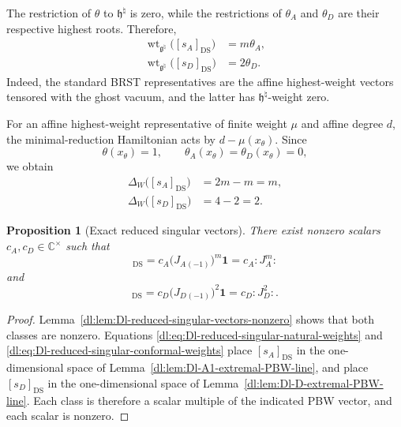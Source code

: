 \documentclass[11pt,reqno]{amsart}
\newtheorem{proposition}[theorem]{Proposition}
\theoremstyle{definition}
\theoremstyle{remark}
\begin{document}
The restriction of \(\theta\) to
\(\mathfrak h^\natural\) is zero, while the restrictions of
\(\theta_A\) and \(\theta_D\) are their respective highest roots.
Therefore,
\begin{equation}
\begin{aligned}
  \operatorname{wt}_{\mathfrak g^\natural}
  \bigl([s_A]_{\mathrm{DS}}\bigr)
  &=m\theta_A,\\
  \operatorname{wt}_{\mathfrak g^\natural}
  \bigl([s_D]_{\mathrm{DS}}\bigr)
  &=2\theta_D.
\end{aligned}
\label{dl:eq:Dl-reduced-singular-natural-weights}
\end{equation}
Indeed, the standard BRST representatives are the affine
highest-weight vectors tensored with the ghost vacuum, and the latter
has \(\mathfrak h^\natural\)-weight zero.

For an affine highest-weight representative of finite weight \(\mu\)
and affine degree \(d\), the minimal-reduction Hamiltonian acts by
\(d-\mu(x_\theta)\).  Since
\begin{equation*}
  \theta(x_\theta)=1,
  \qquad
  \theta_A(x_\theta)=\theta_D(x_\theta)=0,
\end{equation*}
we obtain
\begin{equation}
\begin{aligned}
  \Delta_W\bigl([s_A]_{\mathrm{DS}}\bigr)
  &=
  2m-m=m,\\
  \Delta_W\bigl([s_D]_{\mathrm{DS}}\bigr)
  &=
  4-2=2.
\end{aligned}
\label{dl:eq:Dl-reduced-singular-conformal-weights}
\end{equation}

\begin{proposition}[Exact reduced singular vectors]
\label{dl:prop:Dl-exact-reduced-singular-vectors}
There exist nonzero scalars
\(c_A,c_D\in\mathbb C^\times\) such that
\begin{equation*}
  [s_A]_{\mathrm{DS}}
  =
  c_A
  \bigl(J_A{}_{(-1)}\bigr)^m\mathbf1
  =
  c_A:J_A^m:
\end{equation*}
and
\begin{equation*}
  [s_D]_{\mathrm{DS}}
  =
  c_D
  \bigl(J_D{}_{(-1)}\bigr)^2\mathbf1
  =
  c_D:J_D^2:.
\end{equation*}
\end{proposition}

\begin{proof}
Lemma~\ref{dl:lem:Dl-reduced-singular-vectors-nonzero} shows that both
classes are nonzero.  Equations
\eqref{dl:eq:Dl-reduced-singular-natural-weights} and
\eqref{dl:eq:Dl-reduced-singular-conformal-weights} place
\([s_A]_{\mathrm{DS}}\) in the one-dimensional space of
Lemma~\ref{dl:lem:Dl-A1-extremal-PBW-line}, and place
\([s_D]_{\mathrm{DS}}\) in the one-dimensional space of
Lemma~\ref{dl:lem:Dl-D-extremal-PBW-line}.  Each class is therefore a
scalar multiple of the indicated PBW vector, and each scalar is
nonzero.
\end{proof}
\end{document}
